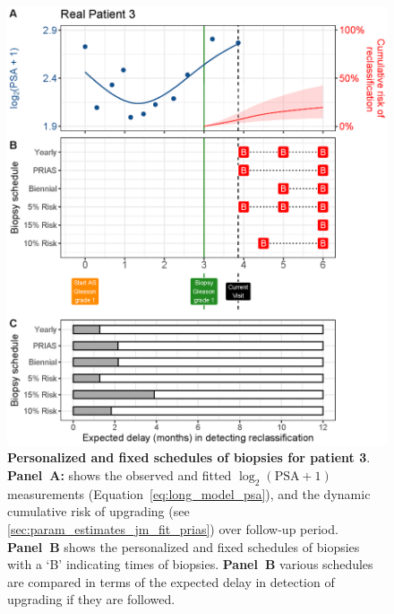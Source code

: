 \begin{figure}
\centerline{\includegraphics[width=\columnwidth]{images/demo_pat3_supp.eps}}
\caption{\textbf{Personalized and fixed schedules of biopsies for patient 3}. \textbf{Panel~A:} shows the observed and fitted $\log_2(\mbox{PSA} + 1)$ measurements (Equation~\ref{eq:long_model_psa}), and the dynamic cumulative risk of upgrading (see \ref{sec:param_estimates_jm_fit_prias}) over follow-up period. \textbf{Panel~B} shows the personalized and fixed schedules of biopsies with a `B' indicating times of biopsies. \textbf{Panel~B} various schedules are compared in terms of the expected delay in detection of upgrading if they are followed.}
\label{fig:demo_pat3_supp}
\end{figure}